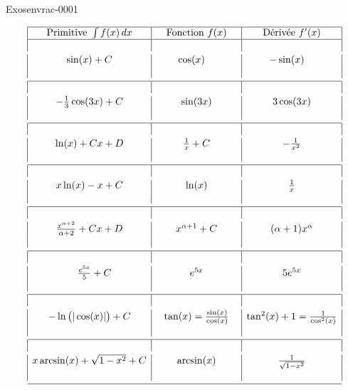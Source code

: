 \begin{corrige}{Exosenvrac-0001}

  \begin{equation}
    \begin{array}{|c|c|c|}\hline 
      \textrm{Primitive } \int f(x)\, dx & \quad\textrm{Fonction } f(x)\quad &\quad \textrm{Dérivée } f'(x)\quad \\\hline 
      \vspace{1mm}&&\\
      \quad\sin(x)+C\quad & \cos(x) \quad& -\sin(x) \quad\\
      \vspace{1mm}&&\\\hline
      \vspace{1mm}&&\\
      -\frac{1}{ 3 }\cos(3x)+C & \sin(3x) & 3\cos(3x) \\
      \vspace{1mm}&&\\\hline 
      \vspace{1mm}&&\\
      \ln(x)+Cx+D & \frac{1}{ x }+C & -\frac{1}{x^2}\\
      \vspace{1mm}&&\\\hline 
      \vspace{1mm}&&\\
      x\ln(x)-x+C & \ln(x) & \frac{1}{ x } \\
      \vspace{1mm}&&\\\hline 
      \vspace{1mm}&&\\
      \frac{ x^{\alpha+2} }{ \alpha+2 }+Cx+D & x^{\alpha+1}+C & \quad(\alpha+1)x^\alpha\quad \\
      \vspace{1mm}&&\\\hline 
      \vspace{1mm}&&\\
      \quad\frac{e^{5x}}{5}+C &  e^{5x} & 5 e^{5x} \\
      \vspace{1mm}&&\\\hline 
      \vspace{1mm}&&\\
      -\ln\big( |\cos(x)| \big)+C  & \tan(x)=\frac{\sin(x)}{\cos(x)} & \tan^2(x)+1=\frac{1}{ \cos^2(x) }\\
      \vspace{1mm}&&\\\hline 
      \vspace{1mm}&&\\
      x\arcsin(x)+\sqrt{1-x^2}+C  &\quad \arcsin(x)\quad & \frac{1}{ \sqrt{1-x^2} } \\
      \vspace{1mm}&&\\\hline 
    \end{array}
  \end{equation}
  
\end{corrige}

